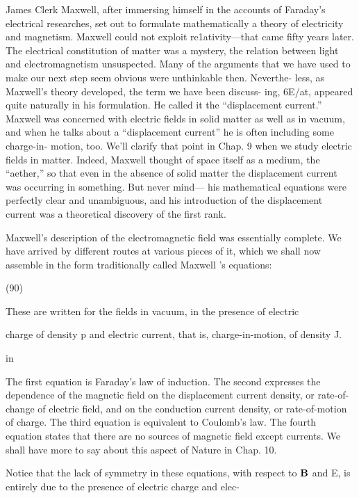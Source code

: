 James Clerk Maxwell, after immersing himself in the accounts of
Faraday's electrical researches, set out to formulate mathematically
a theory of electricity and magnetism. Maxwell could not exploit
re1ativity---that came fifty years later. The electrical constitution
of matter was a mystery, the relation between light and electromagnetism
unsuspected. Many of the arguments that we have used to
make our next step seem obvious were unthinkable then. Neverthe-
less, as Maxwell's theory developed, the term we have been discuss-
ing, 6E/at, appeared quite naturally in his formulation. He called
it the ``displacement current.'' Maxwell was concerned with electric
fields in solid matter as well as in vacuum, and when he talks about
a ``displacement current'' he is often including some charge-in-
motion, too. We'll clarify that point in Chap. 9 when we study electric
fields in matter. Indeed, Maxwell thought of space itself as a
medium, the ``aether,'' so that even in the absence of solid matter the
displacement current was occurring in something. But never mind---
his mathematical equations were perfectly clear and unambiguous,
and his introduction of the displacement current was a theoretical
discovery of the first rank. 

Maxwell's description of the electromagnetic field was essentially
complete. We have arrived by different routes at various pieces of it,
which we shall now assemble in the form traditionally called
Maxwell 's equations:

\begin{equation}
\end{equation}
(90)

 

These are written for the fields in vacuum, in the presence of electric

charge of density p and electric current, that is, charge-in-motion,
of density J.

in

The first equation is Faraday's law of induction. The second
expresses the dependence of the magnetic field on the displacement
current density, or rate-of-change of electric field, and on the conduction
current density, or rate-of-motion of charge. The third
equation is equivalent to Coulomb's law. The fourth equation states
that there are no sources of magnetic field except currents. We shall
have more to say about this aspect of Nature in Chap. 10.

Notice that the lack of symmetry in these equations, with respect
to $\mathbf{B}$ and E, is entirely due to the presence of electric charge and elec-

